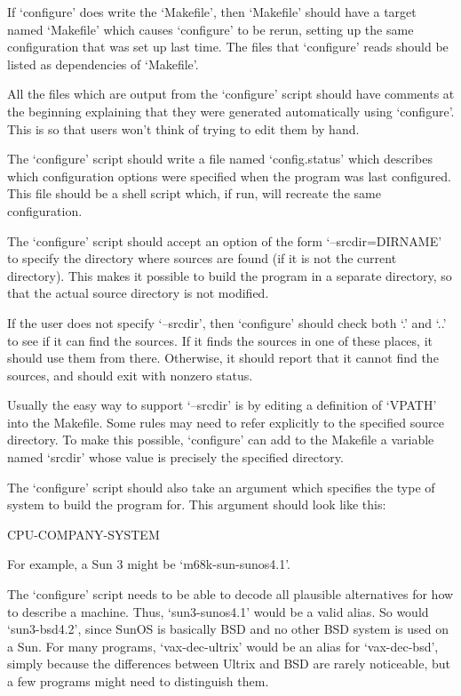    If `configure' does write the `Makefile', then `Makefile' should
have a target named `Makefile' which causes `configure' to be rerun,
setting up the same configuration that was set up last time.  The files
that `configure' reads should be listed as dependencies of `Makefile'.

   All the files which are output from the `configure' script should
have comments at the beginning explaining that they were generated
automatically using `configure'.  This is so that users won't think of
trying to edit them by hand.

   The `configure' script should write a file named `config.status'
which describes which configuration options were specified when the
program was last configured.  This file should be a shell script which,
if run, will recreate the same configuration.

   The `configure' script should accept an option of the form
`--srcdir=DIRNAME' to specify the directory where sources are found (if
it is not the current directory).  This makes it possible to build the
program in a separate directory, so that the actual source directory is
not modified.

   If the user does not specify `--srcdir', then `configure' should
check both `.' and `..' to see if it can find the sources.  If it finds
the sources in one of these places, it should use them from there.
Otherwise, it should report that it cannot find the sources, and should
exit with nonzero status.

   Usually the easy way to support `--srcdir' is by editing a
definition of `VPATH' into the Makefile.  Some rules may need to refer
explicitly to the specified source directory.  To make this possible,
`configure' can add to the Makefile a variable named `srcdir' whose
value is precisely the specified directory.

   The `configure' script should also take an argument which specifies
the type of system to build the program for.  This argument should look
like this:

     CPU-COMPANY-SYSTEM

   For example, a Sun 3 might be `m68k-sun-sunos4.1'.

   The `configure' script needs to be able to decode all plausible
alternatives for how to describe a machine.  Thus, `sun3-sunos4.1'
would be a valid alias.  So would `sun3-bsd4.2', since SunOS is
basically BSD and no other BSD system is used on a Sun.  For many
programs, `vax-dec-ultrix' would be an alias for `vax-dec-bsd', simply
because the differences between Ultrix and BSD are rarely noticeable,
but a few programs might need to distinguish them.

